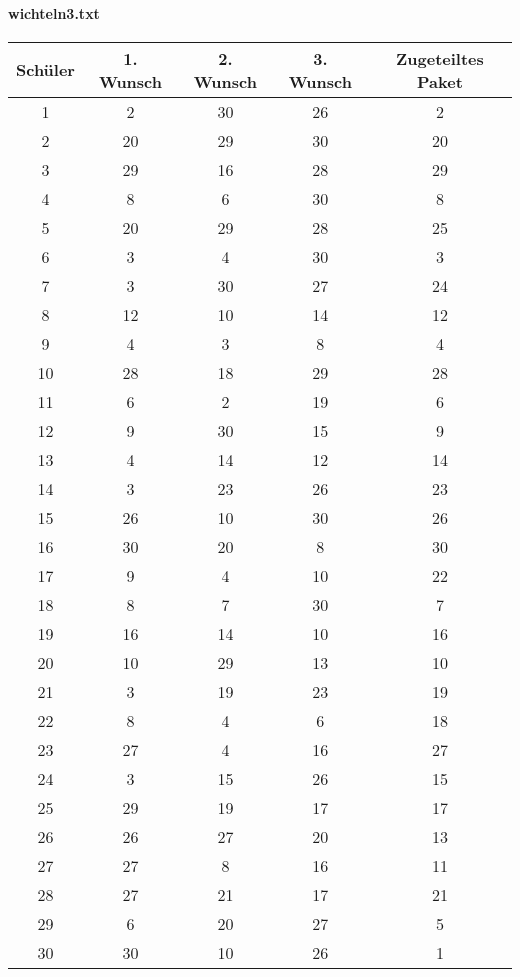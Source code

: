 \documentclass[a4paper,10pt,ngerman]{scrartcl}
\begin{document}
\paragraph{wichteln3.txt}
\begin{longtable}[c]{c|c|c|c|c}
    Schüler & 1. Wunsch & 2. Wunsch & 3. Wunsch & Zugeteiltes Paket \\
    \hline
    \endhead
    1 & 2 & 30 & 26 & 2 \\
    2 & 20 & 29 & 30 & 20 \\
    3 & 29 & 16 & 28 & 29 \\
    4 & 8 & 6 & 30 & 8 \\
    5 & 20 & 29 & 28 & 25 \\
    6 & 3 & 4 & 30 & 3 \\
    7 & 3 & 30 & 27 & 24 \\
    8 & 12 & 10 & 14 & 12 \\
    9 & 4 & 3 & 8 & 4 \\
    10 & 28 & 18 & 29 & 28 \\
    11 & 6 & 2 & 19 & 6 \\
    12 & 9 & 30 & 15 & 9 \\
    13 & 4 & 14 & 12 & 14 \\
    14 & 3 & 23 & 26 & 23 \\
    15 & 26 & 10 & 30 & 26 \\
    16 & 30 & 20 & 8 & 30 \\
    17 & 9 & 4 & 10 & 22 \\
    18 & 8 & 7 & 30 & 7 \\
    19 & 16 & 14 & 10 & 16 \\
    20 & 10 & 29 & 13 & 10 \\
    21 & 3 & 19 & 23 & 19 \\
    22 & 8 & 4 & 6 & 18 \\
    23 & 27 & 4 & 16 & 27 \\
    24 & 3 & 15 & 26 & 15 \\
    25 & 29 & 19 & 17 & 17 \\
    26 & 26 & 27 & 20 & 13 \\
    27 & 27 & 8 & 16 & 11 \\
    28 & 27 & 21 & 17 & 21 \\
    29 & 6 & 20 & 27 & 5 \\
    30 & 30 & 10 & 26 & 1
\end{longtable}
\end{document}
